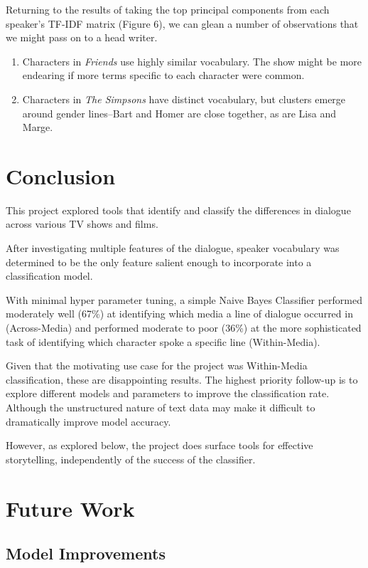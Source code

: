 \documentclass{article}
\begin{document}
\begin{titlepage}
Returning to the results of taking the top principal components from each speaker's TF-IDF matrix (Figure 6), we can glean a number of observations that we might pass on to a head writer.

\begin{enumerate}
\item Characters in \textit{Friends} use highly similar vocabulary. The show might be more endearing if more terms specific to each character were common.
\item Characters in \textit{The Simpsons} have distinct vocabulary, but clusters emerge around gender lines–Bart and Homer are close together, as are Lisa and Marge. 
\end{enumerate}


\section{Conclusion}
This project explored tools that identify and classify the differences in dialogue across various TV shows and films.

After investigating multiple features of the dialogue, speaker vocabulary was determined to be the only feature salient enough to incorporate into a classification model.

With minimal hyper parameter tuning, a simple Naive Bayes Classifier performed moderately well (67\%) at identifying which media a line of dialogue occurred in (Across-Media) and performed moderate to poor (36\%) at the more sophisticated task of identifying which character spoke a specific line (Within-Media).

Given that the motivating use case for the project was Within-Media classification, these are disappointing results. The highest priority follow-up is to explore different models and parameters to improve the classification rate. Although the unstructured nature of text data may make it difficult to dramatically improve model accuracy.

However, as explored below, the project does surface tools for effective storytelling, independently of the success of the classifier.

\section{Future Work}
\subsection{Model Improvements}


\end{titlepage}
\end{document}
